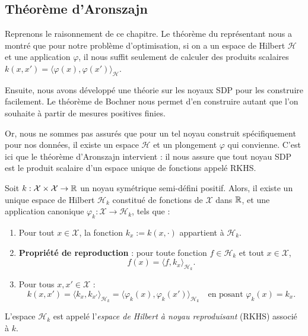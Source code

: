 \subsection{Théorème d'Aronszajn}

Reprenons le raisonnement de ce chapitre. Le théorème du représentant nous a montré que pour notre problème d'optimisation, si on a un espace de Hilbert $ \mathcal{H}$ et une application $ \varphi$, il nous suffit seulement de calculer des produits scalaires $ k(x, x') = \langle \varphi(x), \varphi(x') \rangle_{ \mathcal{H}}$. 

Ensuite, nous avons développé une théorie sur les noyaux SDP pour les construire facilement. Le théorème de Bochner nous permet d'en construire autant que l'on souhaite à partir de mesures positives finies. 

Or, nous ne sommes pas assurés que pour un tel noyau construit spécifiquement pour nos données, il existe un espace $ \mathcal{H}$ et un plongement $ \varphi$ qui convienne. C'est ici que le théorème d'Aronszajn intervient : il nous assure que tout noyau SDP est le produit scalaire d'un espace unique de fonctions appelé RKHS. 

\begin{theorem}
    Soit $k : \mathcal{X} \times \mathcal{X} \to \mathbb{R}$ un noyau symétrique semi-défini positif. Alors, il existe un unique espace de Hilbert $\mathcal{H}_k$ constitué de fonctions de $\mathcal{X}$ dans $\mathbb{R}$, et une application canonique $\varphi_k : \mathcal{X} \to \mathcal{H}_k$, tels que :
    \begin{enumerate}
        \item Pour tout $x \in \mathcal{X}$, la fonction $k_x := k(x, \cdot)$ appartient à $\mathcal{H}_k$.
        \item \textbf{Propriété de reproduction} : pour toute fonction $f \in \mathcal{H}_k$ et tout $x \in \mathcal{X}$,
        \begin{equation}
            f(x) = \langle f, k_x \rangle_{\mathcal{H}_k}.
        \end{equation}
        \item Pour tous $x, x' \in \mathcal{X}$ :
        \begin{equation}
            k(x, x') = \langle k_x, k_{x'} \rangle_{\mathcal{H}_k} = \langle \varphi_k(x), \varphi_k(x') \rangle_{\mathcal{H}_k} \quad \text{en posant } \varphi_k(x) = k_x.
        \end{equation}
    \end{enumerate}
    L'espace $\mathcal{H}_k$ est appelé l'\emph{espace de Hilbert à noyau reproduisant} (RKHS) associé à $k$.
\end{theorem}

